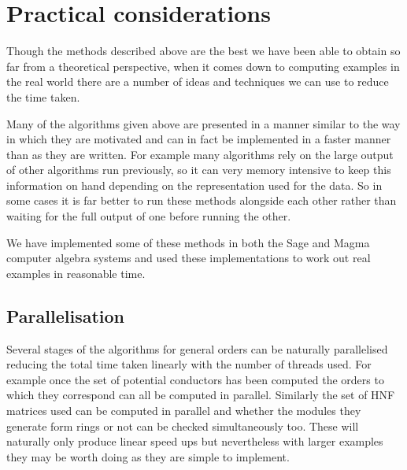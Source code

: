\documentclass[12pt,a4paper,abstracton,bibtotoc]{scrreprt}
\theoremstyle{definition}
\begin{document}
\section{Practical considerations}
Though the methods described above are the best we have been able to obtain so far from a theoretical perspective, when it comes down to computing examples in the real world there are a number of ideas and techniques we can use to reduce the time taken.

Many of the algorithms given above are presented in a manner similar to the way in which they are motivated and can in fact be implemented in a faster manner than as they are written.
For example many algorithms rely on the large output of other algorithms run previously, so it can very memory intensive to keep this information on hand depending on the representation used for the data.
So in some cases it is far better to run these methods alongside each other rather than waiting for the full output of one before running the other.

We have implemented some of these methods in both the Sage and Magma computer algebra systems and used these implementations to work out real examples in reasonable time.

\subsection{Parallelisation}
Several stages of the algorithms for general orders can be naturally parallelised reducing the total time taken linearly with the number of threads used.
For example once the set of potential conductors has been computed the orders to which they correspond can all be computed in parallel.
Similarly the set of HNF matrices used can be computed in parallel and whether the modules they generate form rings or not can be checked simultaneously too.
These will naturally only produce linear speed ups but nevertheless with larger examples they may be worth doing as they are simple to implement.

\end{document}
